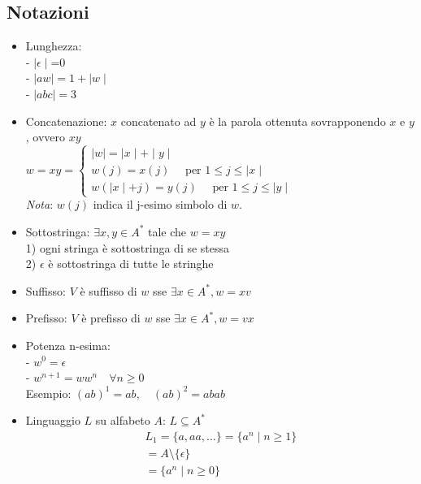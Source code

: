 \documentclass[a4paper,12pt]{article}
\begin{document}
\subsection{Notazioni}
\begin{itemize}
  \item Lunghezza: \\
  - $\mid \epsilon \mid$=0 \\
  - $\mid aw \mid = 1 + \mid w \mid $ \\
  - $\mid abc \mid = 3$
  \item Concatenazione: $x$ concatenato ad $y$ è la parola ottenuta sovrapponendo $x$ e $y$, ovvero $xy$\\
  $w=xy=\begin{cases} 
    \mid w \mid = \mid x \mid + \mid y \mid \\
    w(j)=x(j) \quad \text{ per } 1 \leq j \leq \mid x \mid \\
    w(\mid x \mid + j) = y(j) \quad \text{ per } 1  \leq j \leq \mid y \mid
  \end{cases}$ \\
  \textit{Nota}: $w(j)$ indica il j-esimo simbolo di $w$. \\
  \item Sottostringa: $\exists x,y \in A^*$ tale che $w=xy$ \\
  1) ogni stringa è sottostringa di se stessa \\
  2) $\epsilon$ è sottostringa di tutte le stringhe
  \item Suffisso: $V$ è suffisso di $w$ sse $\exists x \in A^*, w=xv$
  \item Prefisso: $V$ è prefisso di $w$ sse $\exists x \in A^*, w=vx$
  \item Potenza n-esima: \\
  - $w^0 = \epsilon$ \\
  - $w^{n+1} = ww^n \quad \forall n \geq 0$ \\
  Esempio: $(ab)^1=ab, \quad (ab)^2=abab$
  \item Linguaggio $L$ su alfabeto $A$: $L \subseteq A^*$ \\
  \begin{align*}
      L_1 = \{a,aa,\dots \}=\{a^n \mid n \geq 1 \} \\
      = A \setminus \{\epsilon\} \\
      = \{a^n \mid n \geq 0\}
  \end{align*}
\end{itemize}
\end{document}
